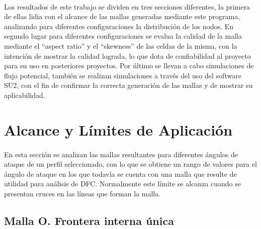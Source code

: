 \documentclass[letterpaper, openright, 12pt]{book}
\begin{document}
    \paragraph*{}
    Los resultados de este trabajo se dividen en tres secciones diferentes,
    la primera de ellas lidia con el alcance de las mallas generadas
    mediante este programa, analizando para diferentes configuraciones la
    distribución de los nodos. En segundo lugar para diferentes
    configuraciones se evalua la calidad de la malla mediante el
    ``aspect ratio'' y el ``skewness'' de las celdas de la misma, con la
    intención de mostrar la calidad lograda, lo que dota de
    confiabilidad al proyecto para su uso en posteriores proyectos.
    Por último se llevan a cabo simulaciones de flujo potencial, también se
    realizan simulaciones a través del uso del software SU2, con el fin de
    confirmar la correcta generación de las mallas y de mostrar su
    aplicabilidad.

    \section{Alcance y Límites de Aplicación}
    \paragraph*{}
    En esta sección se analizan las mallas resultantes para diferentes
    ángulos de ataque de un perfil seleccionado, con lo que se obtiene un
    rango de valores para el ángulo de ataque en los que todavía se cuenta
    con una malla que resulte de utilidad para análisis de DFC\@. Normalmente
    este límite se alcanza cuando se presentan cruces en las líneas que
    forman la malla.

    \subsection{Malla O. Frontera interna única}
\end{document}
